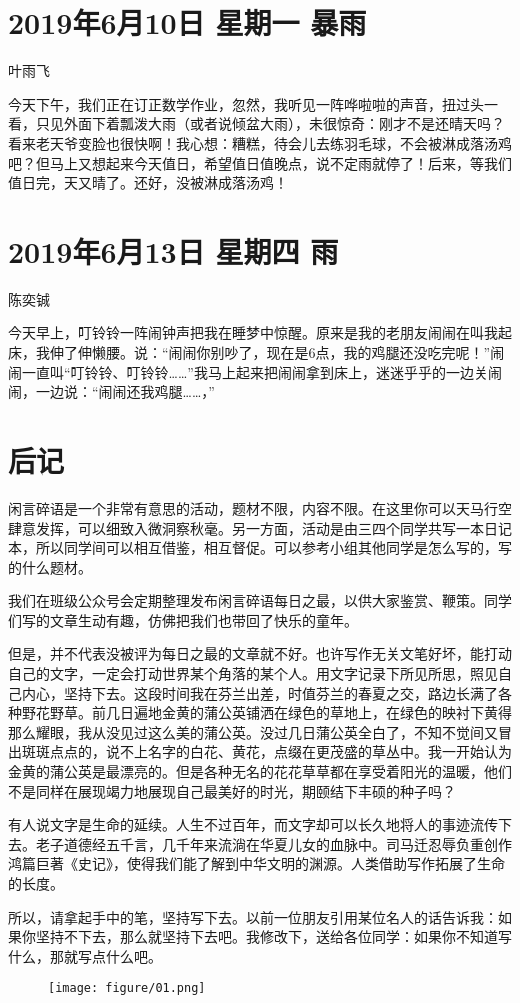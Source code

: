 \section{2019年6月10日 星期一 暴雨}

叶雨飞

今天下午，我们正在订正数学作业，忽然，我听见一阵哗啦啦的声音，扭过头一看，只见外面下着瓢泼大雨（或者说倾盆大雨），未很惊奇：刚才不是还晴天吗？看来老天爷变脸也很快啊！我心想：糟糕，待会儿去练羽毛球，不会被淋成落汤鸡吧？但马上又想起来今天值日，希望值日值晚点，说不定雨就停了！后来，等我们值日完，天又晴了。还好，没被淋成落汤鸡！

\section{2019年6月13日 星期四 雨}

陈奕铖

今天早上，叮铃铃一阵闹钟声把我在睡梦中惊醒。原来是我的老朋友闹闹在叫我起床，我伸了伸懒腰。说：“闹闹你别吵了，现在是6点，我的鸡腿还没吃完呢！”闹闹一直叫“叮铃铃、叮铃铃……”我马上起来把闹闹拿到床上，迷迷乎乎的一边关闹闹，一边说：“闹闹还我鸡腿……，”

\section{后记}

闲言碎语是一个非常有意思的活动，题材不限，内容不限。在这里你可以天马行空肆意发挥，可以细致入微洞察秋毫。另一方面，活动是由三四个同学共写一本日记本，所以同学间可以相互借鉴，相互督促。可以参考小组其他同学是怎么写的，写的什么题材。

我们在班级公众号会定期整理发布闲言碎语每日之最，以供大家鉴赏、鞭策。同学们写的文章生动有趣，仿佛把我们也带回了快乐的童年。

但是，并不代表没被评为每日之最的文章就不好。也许写作无关文笔好坏，能打动自己的文字，一定会打动世界某个角落的某个人。用文字记录下所见所思，照见自己内心，坚持下去。这段时间我在芬兰出差，时值芬兰的春夏之交，路边长满了各种野花野草。前几日遍地金黄的蒲公英铺洒在绿色的草地上，在绿色的映衬下黄得那么耀眼，我从没见过这么美的蒲公英。没过几日蒲公英全白了，不知不觉间又冒出斑斑点点的，说不上名字的白花、黄花，点缀在更茂盛的草丛中。我一开始认为金黄的蒲公英是最漂亮的。但是各种无名的花花草草都在享受着阳光的温暖，他们不是同样在展现竭力地展现自己最美好的时光，期颐结下丰硕的种子吗？

有人说文字是生命的延续。人生不过百年，而文字却可以长久地将人的事迹流传下去。老子道德经五千言，几千年来流淌在华夏儿女的血脉中。司马迁忍辱负重创作鸿篇巨著《史记》，使得我们能了解到中华文明的渊源。人类借助写作拓展了生命的长度。

所以，请拿起手中的笔，坚持写下去。以前一位朋友引用某位名人的话告诉我：如果你坚持不下去，那么就坚持下去吧。我修改下，送给各位同学：如果你不知道写什么，那就写点什么吧。

\begin{figure}[htb]
    \centering
    \texttt{[image: figure/01.png]}
\end{figure}
